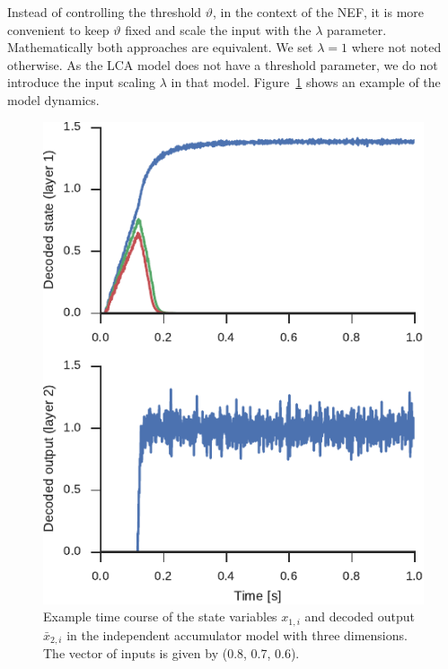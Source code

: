 \documentclass[10pt,letterpaper]{article}
\begin{document}
Instead of controlling the threshold $\vartheta$, in the context of the NEF, it 
is more convenient to keep $\vartheta$ fixed and scale the input with the 
$\lambda$ parameter. Mathematically both approaches are equivalent. We set 
$\lambda = 1$ where not noted otherwise. As the LCA model does not have 
a threshold parameter, we do not introduce the input scaling $\lambda$ in that 
model.  Figure~\ref{fig:indacc} shows an example of the model dynamics.
\begin{figure}
    \centering
    \includegraphics{figures/indacc}
    \caption{Example time course of the state variables $x_{1,i}$ and decoded 
        output $\bar{x}_{2,i}$ in the independent accumulator model with three 
        dimensions. The vector of inputs is given by (0.8, 0.7, 0.6).
    }\label{fig:indacc}
\end{figure}
\end{document}
